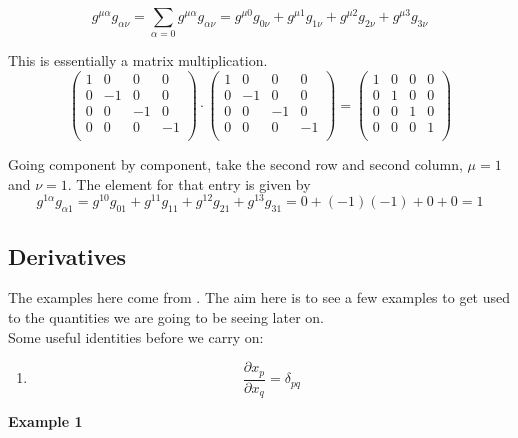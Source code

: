 $$
g^{\mu\alpha} g_{\alpha\nu} = \sum_{\alpha = 0} g^{\mu\alpha} g_{\alpha\nu} =
g^{\mu 0} g_{0 \nu} + g^{\mu 1} g_{1\nu} + g^{\mu 2} g_{2\nu} + g^{\mu 3} g_{3\nu}
$$

This is essentially a matrix multiplication.
$$
\begin{pmatrix}
    1 & 0  & 0  & 0  \\
    0 & -1 & 0  & 0  \\
    0 & 0  & -1 & 0  \\
    0 & 0  & 0  & -1 \\
\end{pmatrix}
\cdot
\begin{pmatrix}
    1 & 0  & 0  & 0  \\
    0 & -1 & 0  & 0  \\
    0 & 0  & -1 & 0  \\
    0 & 0  & 0  & -1 \\
\end{pmatrix}
=
\begin{pmatrix}
    1 & 0 & 0 & 0 \\
    0 & 1 & 0 & 0 \\
    0 & 0 & 1 & 0 \\
    0 & 0 & 0 & 1 \\
\end{pmatrix}
$$

Going component by component, take the second row and second column, $\mu=1$ and $\nu=1$.
The element for that entry is given by
$$
g^{1\alpha}g_{\alpha 1} =
g^{1 0} g_{0 1} + g^{1 1} g_{1 1} + g^{1 2} g_{2 1} + g^{1 3} g_{3 1}
= 0 + (-1)(-1) + 0 + 0 = 1
$$


\subsection{Derivatives}

The examples here come from \cite{tensor-calc}.
The aim here is to see a few examples to get used to the quantities we are going to be seeing later on.
\\

Some useful identities before we carry on:
\begin{enumerate}
    \item
    $$
    \frac{\partial x_p}{\partial x_q} = \delta_{pq}
    $$
\end{enumerate}



\textbf{Example 1}

